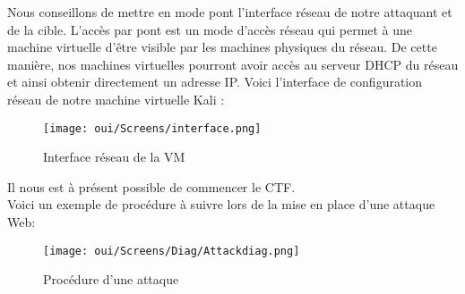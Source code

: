 \newpage
Nous conseillons de mettre en mode pont l'interface réseau de notre attaquant et de la cible. L’accès par pont est un mode d’accès réseau qui permet à une machine virtuelle d’être visible par les machines physiques du réseau. De cette manière, nos machines virtuelles pourront avoir accès au serveur DHCP du réseau et ainsi obtenir directement un adresse IP. Voici l’interface de configuration réseau de notre machine virtuelle Kali :
\begin{figure}[htp!]
  \centering
  \setlength\figureheight{7cm}
  \setlength\figurewidth{9cm}
  \texttt{[image: oui/Screens/interface.png]}
  \caption{Interface réseau de la VM}
  \label{fig:courbe-tikz}
\end{figure}

Il nous est à présent possible de commencer le CTF. \\ Voici un exemple de procédure à suivre lors de la mise en place d'une attaque Web:

\begin{figure}[htp!]
  \centering
  \setlength\figureheight{7cm}
  \setlength\figurewidth{9cm}
  \texttt{[image: oui/Screens/Diag/Attackdiag.png]}
  \caption{Procédure d'une attaque}
  \label{fig:courbe-tikz}
\end{figure}